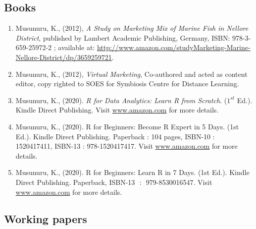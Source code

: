 \documentclass[10pt]{article}
\begin{document}
\subsection{Books} 
\begin{enumerate} 

\item Musunuru, K., (2012), \emph{A Study on Marketing Mix of Marine Fish in Nellore District}, published by Lambert Academic  Publishing,  Germany,  ISBN:  978-3-659-25972-2  ;  available  at:  \url{http://www.amazon.com/studyMarketing-Marine-Nellore-District/dp/3659259721}. 

\item Musunuru, K., (2012), \emph{Virtual  Marketing}, Co-authored  and  acted as  content editor, copy  righted to  SOES for Symbiosis Centre for Distance Learning. 

\item Musunuru, K., (2020). \emph{R for Data Analytics: Learn R from Scratch}. ($1^{st}$ Ed.).  Kindle Direct Publishing. Visit \href{https://www.amazon.com/author/kamakshaiahmusunuru}{www.amazon.com} for more details. 


\item Musunuru, K., (2020). R for Beginners: Become R Expert in 5 Days. (1st Ed.). Kindle Direct Publishing. Paperback : 104 pages, ISBN-10 : 1520417411, ISBN-13 : 978-1520417417. Visit \href{https://www.amazon.in/Kamakshaiah-Musunuru/e/B08C7SVM7V}{www.amazon.com} for more details.

\item Musunuru, K., (2020). R for Beginners: Learn R in 7 Days. (1st Ed.). Kindle Direct Publishing. Paperback, ISBN-13 ‏ : ‎ 979-8530016547. Visit \href{https://www.amazon.in/Beginners-Learn-Days/dp/B098RS71Q4/}{www.amazon.com} for more details.

\end{enumerate} 

\subsection{Working papers}
\end{document}
